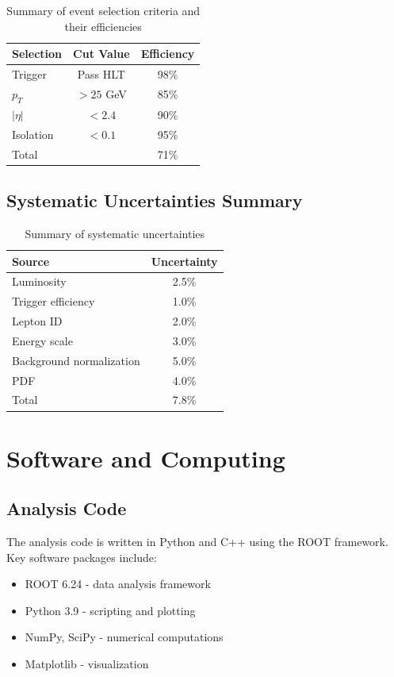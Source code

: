 \begin{table}[htbp]
  \centering
  \caption{Summary of event selection criteria and their efficiencies}
  \label{tab:selection-cuts}
  \begin{tabular}{lcc}
    \hline
    Selection & Cut Value & Efficiency \\
    \hline
    Trigger & Pass HLT & 98\% \\
    $p_T$ & $> 25$ GeV & 85\% \\
    $|\eta|$ & $< 2.4$ & 90\% \\
    Isolation & $< 0.1$ & 95\% \\
    \hline
    Total & & 71\% \\
    \hline
  \end{tabular}
\end{table}

\subsection{Systematic Uncertainties Summary}

\begin{table}[htbp]
  \centering
  \caption{Summary of systematic uncertainties}
  \label{tab:systematics}
  \begin{tabular}{lc}
    \hline
    Source & Uncertainty \\
    \hline
    Luminosity & 2.5\% \\
    Trigger efficiency & 1.0\% \\
    Lepton ID & 2.0\% \\
    Energy scale & 3.0\% \\
    Background normalization & 5.0\% \\
    PDF & 4.0\% \\
    \hline
    Total & 7.8\% \\
    \hline
  \end{tabular}
\end{table}

\section{Software and Computing}

\subsection{Analysis Code}

The analysis code is written in Python and C++ using the ROOT framework. Key software packages include:
\begin{itemize}
  \item ROOT 6.24 - data analysis framework
  \item Python 3.9 - scripting and plotting
  \item NumPy, SciPy - numerical computations
  \item Matplotlib - visualization
\end{itemize}


